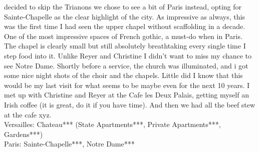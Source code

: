 decided to skip the Trianons we chose to see a bit of Paris instead, opting for Sainte-Chapelle as the clear highlight of the city. As impressive as always, this was the first time I had seen the upper chapel without scaffolding in a decade. One of the most impressive spaces of French gothic, a must-do when in Paris. The chapel is clearly small but still absolutely breathtaking every single time I step food into it. Unlike Reyer and Christine I didn't want to miss my chance to see Notre Dame. Shortly before a service, the church was illuminated, and i got some nice night shots of the choir and the chapels. Little did I know that this would be my last visit for what seems to be maybe even for the next 10 years. I met up with Christine and Reyer at the Cafe les Deux Palais, getting myself an Irish coffee (it is great, do it if you have time). And then we had all the beef stew at the cafe xyz.\\

Versailles: Chateau*** (State Apartments***, Private Apartments***, Gardens***)\\
Paris: Sainte-Chapelle***, Notre Dame***\\

